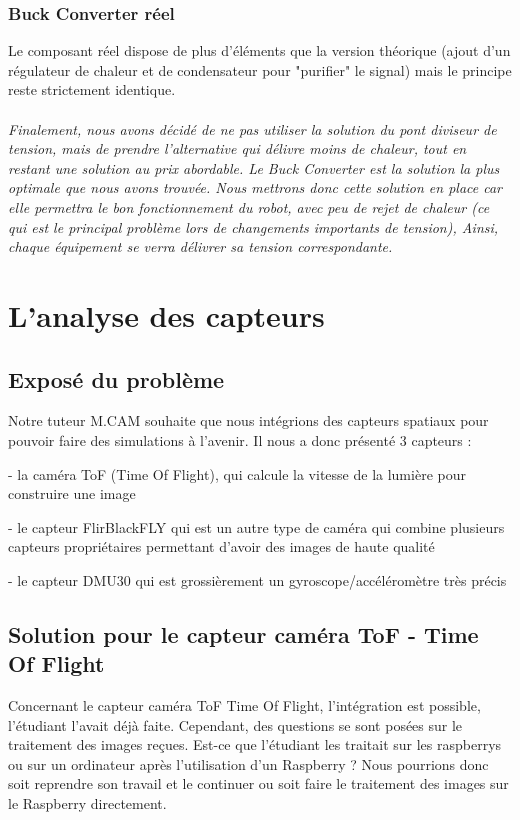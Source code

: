 \documentclass{PackagerQualityN}
\begin{document}
\subsubsection{Buck Converter réel}
Le composant réel dispose de plus d'éléments que la version théorique (ajout d'un régulateur de chaleur et de condensateur pour "purifier" le signal) mais le principe reste strictement identique.


\paragraph{}
\textit{Finalement, nous avons décidé de ne pas utiliser la solution du pont diviseur de tension, mais de prendre l’alternative qui délivre moins de chaleur, tout en restant une solution au prix abordable.
Le Buck Converter est la solution la plus optimale que nous avons trouvée.
Nous mettrons donc cette solution en place car elle permettra le bon fonctionnement du robot, avec peu de rejet de chaleur (ce qui est le principal problème lors de changements importants de tension), 
Ainsi, chaque équipement se verra délivrer sa tension correspondante.}

\clearpage

\newp
\section{ L’analyse des capteurs}
\subsection{Exposé du problème}
Notre tuteur M.CAM souhaite que nous intégrions des capteurs spatiaux pour pouvoir faire des simulations à l'avenir. Il nous a donc présenté 3 capteurs : 

- la caméra ToF (Time Of Flight), qui calcule la vitesse de la lumière pour construire une image

- le capteur FlirBlackFLY qui est un autre type de caméra qui combine plusieurs capteurs propriétaires permettant d'avoir des images de haute qualité

- le capteur DMU30 qui est grossièrement un gyroscope/accéléromètre très précis

\subsection{Solution pour le capteur caméra ToF - Time Of Flight}
Concernant le capteur caméra ToF Time Of Flight, l’intégration est possible, l’étudiant l’avait déjà faite. Cependant, des questions se sont posées sur le traitement des images reçues. Est-ce que l’étudiant les traitait sur les raspberrys ou sur un ordinateur après l'utilisation d’un Raspberry ?
Nous pourrions donc soit reprendre son travail et le continuer ou soit faire le traitement des images sur le Raspberry directement.
\newp %
\end{document}

